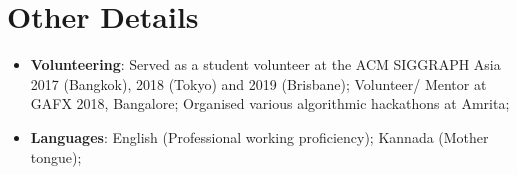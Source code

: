\documentclass[a4paper,11pt]{article}
\newcommand{\resumeItem}[2]{
  \item\small{
    \textbf{#1}{: #2 \vspace{-2pt}}
  }
}
\newcommand{\resumeSubItem}[2]{
  \resumeItem{#1}{#2}
  \vspace{-4pt}
}
\newcommand{\resumeSubHeadingListStart}{
  \begin{itemize}[leftmargin=*]
}
\newcommand{\resumeSubHeadingListEnd}{
  \end{itemize}
}
\begin{document}
  \section{Other Details}
    \resumeSubHeadingListStart
      \resumeSubItem{Volunteering}
        {Served as a student volunteer at the ACM SIGGRAPH Asia 2017 (Bangkok), 2018 (Tokyo) and 2019 (Brisbane);
          Volunteer/ Mentor at GAFX 2018, Bangalore;
          Organised various algorithmic hackathons at Amrita; }
      \resumeSubItem{Languages}
        {English (Professional working proficiency); Kannada (Mother tongue);}
    \resumeSubHeadingListEnd

\end{document}
